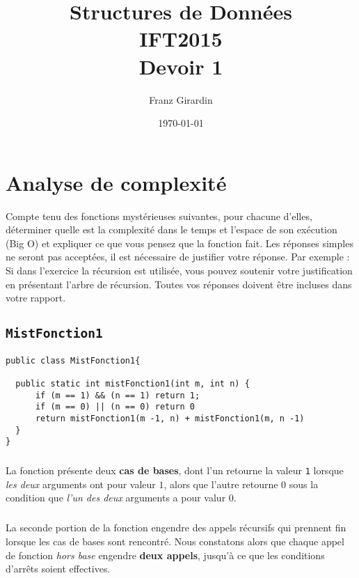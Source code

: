 \documentclass[9pt]{report}
\title{\Huge{Structures de Données}\\{IFT2015}\\{\textbf{Devoir 1}}}
\author{\huge{Franz Girardin}}
\date{\today}
\begin{document}
\maketitle

\pagebreak
\tableofcontents
\pagebreak


\chapter{Analyse de complexité}
  \vspace{-2em}
\begin{multicols*}{2}
  \small
  \begin{Exercice}{}{}
    Compte tenu des fonctions mystérieuses suivantes, pour chacune d’elles, 
    déterminer quelle est la complexité dans le temps et l’espace de son exécution 
    (Big O) et expliquer ce que vous pensez que la fonction fait. Les réponses 
    simples ne seront pas acceptées, il est nécessaire de justifier votre réponse.
    Par exemple : Si dans l’exercice la récursion est utilisée, vous pouvez 
    soutenir votre justification en présentant l’arbre de récursion. 
    Toutes vos réponses doivent être incluses dans votre rapport.
  \end{Exercice}
  \section{\texttt{MistFonction1}}
  \vspace{-1em}

  \begin{lstlisting}[style=JavaDraculaWhite]
public class MistFonction1{

  public static int mistFonction1(int m, int n) {
      if (m == 1) && (n == 1) return 1; 
      if (m == 0) || (n == 0) return 0
      return mistFonction1(m -1, n) + mistFonction1(m, n -1)
  }
}\end{lstlisting}
  \vspace{-1em}

  \paragraph{}
  La fonction présente deux \textbf{cas de bases}, dont l'un retourne la valeur 
  \texttt{1} lorsque \textit{les deux} arguments ont pour valeur $1$, alors que 
  l'autre retourne $0$ sous la condition que \textit{l'un des deux} arguments 
    a pour valur $0$. 

  \paragraph{}
  La seconde portion de la fonction engendre des appels récursifs 
  qui prennent fin lorsque les cas de bases sont rencontré. Nous constatons 
  alors que chaque appel de fonction \textit{hors base} engendre 
  \textbf{deux appels}, jusqu'à ce que les conditions d'arrêts soient effectives. 
  

\end{multicols*}
\end{document}
